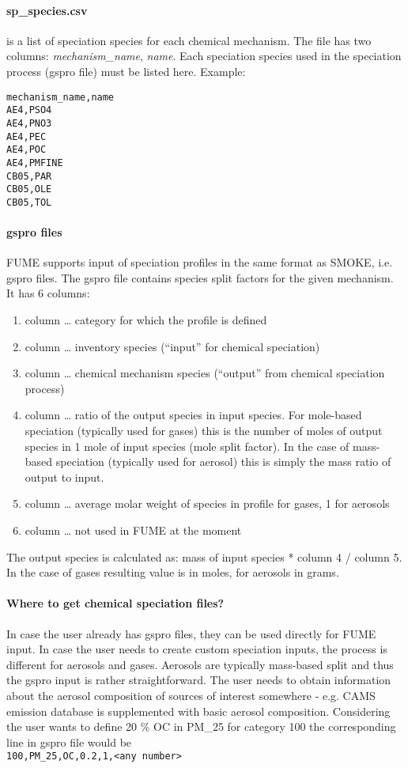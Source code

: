 \documentclass[a4paper,11pt]{article}
\begin{document}
\paragraph{sp\_species.csv} is a 
list of speciation species for each chemical mechanism. The file has
two columns: {\em mechanism\_name}, {\em name}. Each speciation species used in the speciation process (gspro file) must be listed here. Example:
\begin{verbatim}
mechanism_name,name
AE4,PSO4
AE4,PNO3
AE4,PEC
AE4,POC
AE4,PMFINE
CB05,PAR
CB05,OLE
CB05,TOL
\end{verbatim}
\paragraph{gspro files} FUME supports input of speciation profiles in the same format as SMOKE, i.e. gspro files. 
The gspro file contains species split factors for the given mechanism. It has 6 columns:
  \begin{enumerate}
  \def\labelenumii{\arabic{enumii}.}
  \item column \ldots{} category for which the profile is defined
  \item column \ldots{} inventory species (``input'' for chemical speciation)
  \item column \ldots{} chemical mechanism species (``output'' from chemical
    speciation process)
  \item column \ldots{} ratio of the output species in input species. For
    mole-based speciation (typically used for gases) this is the number
    of moles of output species in 1 mole of input species (mole split
    factor). In the case of mass-based speciation (typically used for
    aerosol) this is simply the mass ratio of output to input.
  \item column \ldots{} average molar weight of species in profile for
    gases, 1 for aerosols
  \item
    column \ldots{} not used in FUME at the moment
  \end{enumerate}
  The output species is calculated as: mass of input species * column 4 /
  column 5. In the case of gases resulting value is in moles, for
  aerosols in grams.

\paragraph{Where to get chemical speciation files?} In
case the user already has gspro files, they can be used directly for FUME
input. In case the user needs to create custom speciation inputs, the
process is different for aerosols and gases. Aerosols are typically
mass-based split and thus the gspro input is rather straightforward.
The user needs to obtain information about the aerosol composition of
sources of interest somewhere - e.g. CAMS emission database is supplemented with basic aerosol composition. Considering the user wants to
define 20 \% OC in PM\_25 for category 100 the corresponding line in
gspro file would be\\
\verb|100,PM_25,OC,0.2,1,<any number>|
\end{document}
